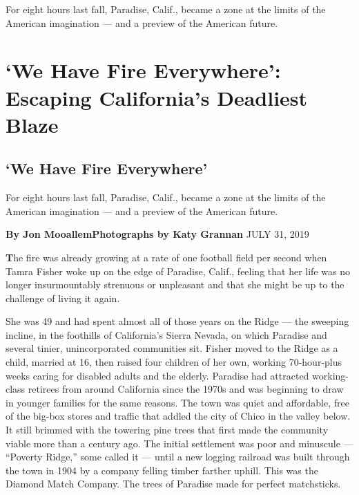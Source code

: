 For eight hours last fall, Paradise, Calif., became a zone at the limits
of the American imagination --- and a preview of the American future.

\hypertarget{we-have-fire-everywhere-escaping-californias-deadliest-blaze-1}{%
\section{`We Have Fire Everywhere': Escaping California's Deadliest
Blaze}\label{we-have-fire-everywhere-escaping-californias-deadliest-blaze-1}}

\hypertarget{we-have-fire-everywhere}{%
\subsection{`We Have Fire Everywhere'}\label{we-have-fire-everywhere}}

For eight hours last fall, Paradise, Calif., became a zone at the limits
of the American imagination --- and a preview of the American future.

 \textbf{By Jon MooallemPhotographs by Katy Grannan} JULY 31, 2019

\textbf{T}he fire was already growing at a rate of one football field
per second when Tamra Fisher woke up on the edge of Paradise, Calif.,
feeling that her life was no longer insurmountably strenuous or
unpleasant and that she might be up to the challenge of living it again.

She was 49 and had spent almost all of those years on the Ridge --- the
sweeping incline, in the foothills of California's Sierra Nevada, on
which Paradise and several tinier, unincorporated communities sit.
Fisher moved to the Ridge as a child, married at 16, then raised four
children of her own, working 70-hour-plus weeks caring for disabled
adults and the elderly. Paradise had attracted working-class retirees
from around California since the 1970s and was beginning to draw in
younger families for the same reasons. The town was quiet and
affordable, free of the big-box stores and traffic that addled the city
of Chico in the valley below. It still brimmed with the towering pine
trees that first made the community viable more than a century ago. The
initial settlement was poor and minuscule --- ``Poverty Ridge,'' some
called it --- until a new logging railroad was built through the town in
1904 by a company felling timber farther uphill. This was the Diamond
Match Company. The trees of Paradise made for perfect matchsticks.

